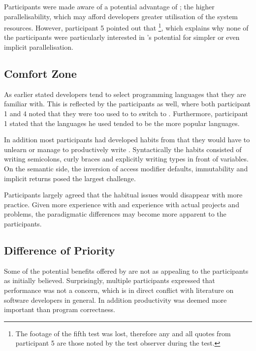 Participants were made aware of a potential advantage of \fs; the higher parallelisability, which may afford developers greater utilisation of the system resources. However, participant 5 pointed out that \footnote{The footage of the fifth test was lost, therefore any and all quotes from participant 5 are those noted by the test observer during the test.}, which explains why none of the participants were particularly interested in \fs's potential for simpler or even implicit parallelisation.

\subsection{Comfort Zone}
As earlier stated developers tend to select programming languages that they are familiar with\cite{meyerovich2013empirical}. This is reflected by the participants as well, where both participant 1 and 4 noted that they were too used to \cs to switch to \fs. Furthermore, participant 1 stated that the languages he used tended to be the more popular languages.


In addition most participants had developed habits from \cs that they would have to unlearn or manage to productively write \fs. Syntactically the habits consisted of writing semicolons, curly braces and explicitly writing types in front of variables. On the semantic side, the inversion of access modifier defaults, immutability and implicit returns posed the largest challenge.



Participants largely agreed that the habitual issues would disappear with more practice. Given more experience with \fs and experience with actual projects and problems, the paradigmatic differences may become more apparent to the participants.

\subsection{Difference of Priority}\label{sec:diff-pri}
Some of the potential benefits offered by \fs are not as appealing to the participants as initially believed. Surprisingly, multiple  participants expressed that performance was not a concern, which is in direct conflict with literature on software developers in general\cite{meyerovich2013empirical}. In addition productivity was deemed more important than program correctness.

